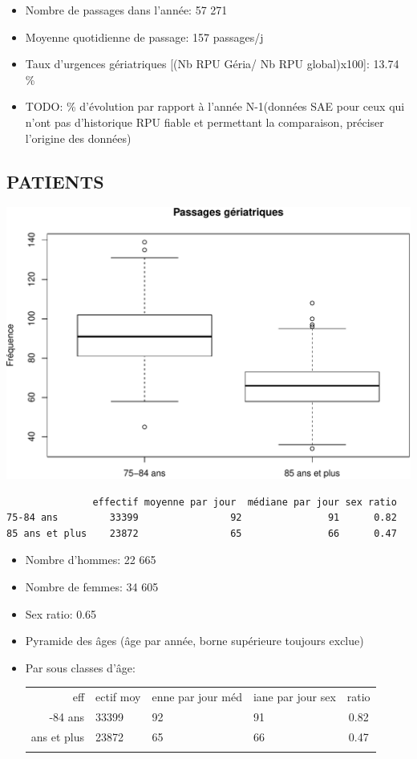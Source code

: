 \documentclass[]{article}
\begin{document}
\begin{itemize}
\itemsep1pt\parskip0pt
\item
  Nombre de passages dans l'année: 57 271
\item
  Moyenne quotidienne de passage: 157 passages/j
\item
  Taux d'urgences gériatriques {[}(Nb RPU Géria/ Nb RPU global)x100{]}:
  13.74 \%
\item
  TODO: \% d'évolution par rapport à l'année N-1(données SAE pour ceux
  qui n'ont pas d'historique RPU fiable et permettant la comparaison,
  préciser l'origine des données)
\end{itemize}

\subsection{PATIENTS}\label{patients-2}

\includegraphics{rapport2014_V4_files/figure-latex/sexe75-1.pdf}

\begin{verbatim}
               effectif moyenne par jour  médiane par jour sex ratio
75-84 ans         33399                92               91      0.82
85 ans et plus    23872                65               66      0.47
\end{verbatim}

\begin{itemize}
\item
  Nombre d'hommes: 22 665
\item
  Nombre de femmes: 34 605
\item
  Sex ratio: 0.65
\item
  Pyramide des âges (âge par année, borne supérieure toujours exclue)
\item
  Par sous classes d'âge:

  \begin{longtable}[c]{@{}rlllc@{}}
  \toprule\addlinespace
  eff & ectif moy & enne par jour méd & iane par jour sex & ratio
  \\\addlinespace
  \midrule\endhead
  75-84 ans & 33399 & 92 & 91 & 0.82
  \\\addlinespace
  85 ans et plus & 23872 & 65 & 66 & 0.47
  \\\addlinespace
  \bottomrule
  \end{longtable}
\end{itemize}
\end{document}
